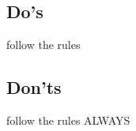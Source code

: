 \subsection{Do's}
\label{sub:dos}
follow the rules
\subsection{Don'ts}
\label{sub:donts}
follow the rules ALWAYS

